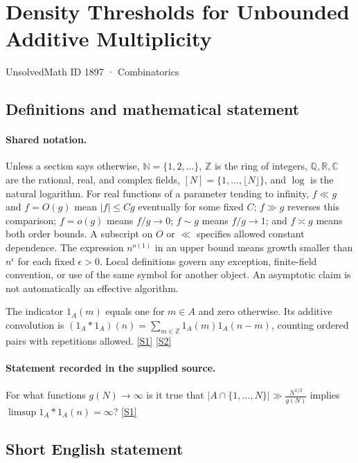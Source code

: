 \documentclass[11pt,a4paper]{article}
\newcommand{\N}{\mathbb{N}}
\newcommand{\Z}{\mathbb{Z}}
\newcommand{\Q}{\mathbb{Q}}
\newcommand{\R}{\mathbb{R}}
\newcommand{\C}{\mathbb{C}}
\newcommand{\sref}[2]{\hyperlink{source:#1:#2}{[S#2]}}
\begin{document}

\setcounter{section}{1896}

\section{Density Thresholds for Unbounded Additive Multiplicity}\label{1897}

{\small\sffamily UnsolvedMath ID 1897 · Combinatorics}

\subsection{Definitions and mathematical statement}

\paragraph{Shared notation.}Unless a section says otherwise, $\N=\{1,2,\ldots\}$,
$\Z$ is the ring of integers, $\Q,\R,\C$ are the rational, real, and complex
fields, $[N]=\{1,\ldots,\lfloor N\rfloor\}$, and $\log$ is the natural
logarithm. For real functions of a parameter tending to infinity,
$f\ll g$ and $f=O(g)$ mean $|f|\leq Cg$ eventually for some fixed $C$;
$f\gg g$ reverses this comparison; $f=o(g)$ means $f/g\to0$;
$f\sim g$ means $f/g\to1$; and $f\asymp g$ means both order bounds.
A subscript on $O$ or $\ll$ specifies allowed constant dependence.
The expression $n^{o(1)}$ in an upper bound means growth smaller than
$n^\epsilon$ for each fixed $\epsilon>0$. Local definitions govern any
exception, finite-field convention, or use of the same symbol for another
object. An asymptotic claim is not automatically an effective algorithm.



The indicator $1_A(m)$ equals one for $m\in A$ and zero otherwise. Its additive convolution is $(1_A*1_A)(n)=\sum_{m\in\Z}1_A(m)1_A(n-m)$, counting ordered pairs with repetitions allowed. \sref{1897}{1} \sref{1897}{2}

\paragraph{Statement recorded in the supplied source.}
For what functions $g(N)\to \infty$ is it true that $ \lvert A\cap \{1,\ldots,N\}\rvert \gg \frac{N^{1/2}}{g(N)} $ implies $\limsup 1_A\ast 1_A(n)=\infty$? \sref{1897}{1}

\subsection{Short English statement}
\end{document}
